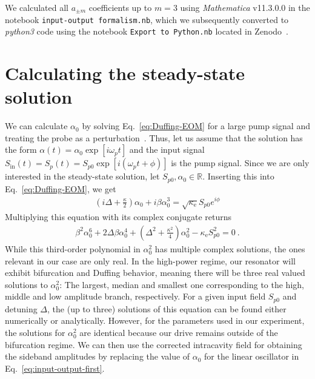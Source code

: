 We calculated all $a_{\pm m}$ coefficients up to $m=3$ using \textit{Mathematica} v11.3.0.0 in the notebook \texttt{input-output formalism.nb}, which we subsequently converted to \textit{python3} code using the notebook \texttt{Export to Python.nb} located in Zenodo~\cite{schmidtDataProcessingCurrent2020}.

\section{Calculating the steady-state solution}\label{sec:Duffing}
% 
We can calculate $\alpha_0$ by solving Eq.~\eqref{eq:Duffing-EOM} for a large pump signal and treating the probe as a perturbation~\cite{castellanos-beltranDevelopmentJosephsonParametric2010}.
% 
Thus, let us assume that the solution has the form $\alpha(t)=\alpha_0 \exp [i\omega_p t]$ and the input signal $S_\text{in}(t) = S_p(t) =S_{p0} \exp [i(\omega_p t+\phi)]$ is the pump signal.
% 
Since we are only interested in the steady-state solution, let $S_{p0},\alpha_0 \in \mathbb{R}$.
% 
Inserting this into Eq.~\eqref{eq:Duffing-EOM}, we get
% 
\begin{align}
\left(i\Delta+\frac{\kappa}{2}\right)\alpha_0 + i\beta\alpha_0^3=\sqrt{\kappa_\text{e}}S_{p0}e^{i\phi}
\end{align}
% 
Multiplying this equation with its complex conjugate returns
% 
\begin{align}
\beta^2 \alpha_0^6 + 2\Delta\beta\alpha_0^4 + \left(\Delta^2+\frac{\kappa^2}{4}\right)\alpha_0^2 - \kappa_\text{e} S_{p0}^2 = 0\ .
\label{eq:polynom}
\end{align}
% 
While this third-order polynomial in $\alpha_0^2$ has multiple complex solutions, the ones relevant in our case are only real.
% 
In the high-power regime, our resonator will exhibit bifurcation and Duffing behavior, meaning there will be three real valued solutions to $\alpha_0^2$:
% 
The largest, median and smallest one corresponding to the high, middle and low amplitude branch, respectively.
% 
For a given input field $S_{p0}$ and detuning $\Delta$, the (up to three) solutions of this equation can be found either numerically or analytically.
% 
However, for the parameters used in our experiment, the solutions for $\alpha_0^2$ are identical because our drive remains outside of the bifurcation regime.
% 
We can then use the corrected intracavity field for obtaining the sideband amplitudes by replacing the value of $\alpha_0$ for the linear oscillator in Eq.~\eqref{eq:input-output-first}.

